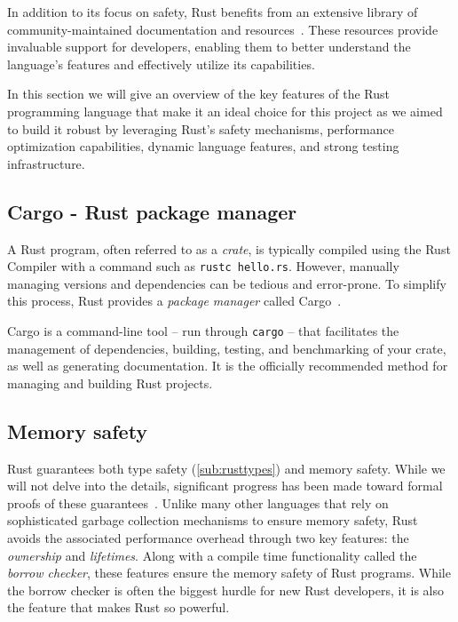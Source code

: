 \documentclass[11pt]{report}
\theoremstyle{definition}
\theoremstyle{plain}
\begin{document}
In addition to its focus on safety, Rust benefits from an extensive library of community-maintained documentation and resources~\cite{rustlangRustProgramming,rustlangPerformanceBook,lurklurkEffectiveRust}. These resources provide invaluable support for developers, enabling them to better understand the language's features and effectively utilize its capabilities.

In this section we will give an overview of the key features of the Rust programming language that make it an ideal choice for this project as we aimed to build it robust by leveraging Rust's safety mechanisms, performance optimization capabilities, dynamic language features, and strong testing infrastructure.

\subsection{Cargo - Rust package manager}\label{sec:cargo}
A Rust program, often referred to as a \textit{crate}, is typically compiled using the Rust Compiler with a command such as \texttt{rustc hello.rs}. However, manually managing versions and dependencies can be tedious and error-prone. To simplify this process, Rust provides a \textit{package manager} called Cargo~\cite{rustlangCargo}.

Cargo is a command-line tool -- run through \texttt{cargo} -- that facilitates the management of dependencies, building, testing, and benchmarking of your crate, as well as generating documentation. It is the officially recommended method for managing and building Rust projects.


\subsection{Memory safety}\label{sec:rustborrow} %
Rust guarantees both type safety (\autoref{sub:rusttypes}) and memory safety. While we will not delve into the details, significant progress has been made toward formal proofs of these guarantees~\cite{jung2017rustbelt}. Unlike many other languages that rely on sophisticated garbage collection mechanisms to ensure memory safety, Rust avoids the associated performance overhead through two key features: the \textit{ownership} and \textit{lifetimes}. Along with a compile time functionality called the \textit{borrow checker}, these features ensure the memory safety of Rust programs. While the borrow checker is often the biggest hurdle for new Rust developers, it is also the feature that makes Rust so powerful.
\end{document}
